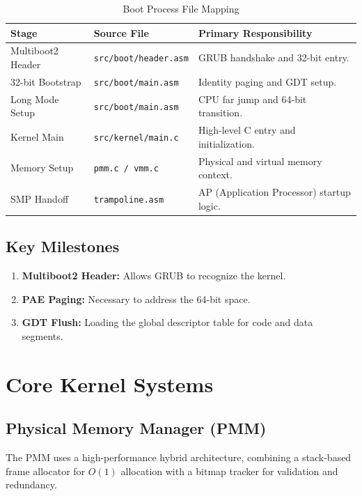 \documentclass[12pt,a4paper]{report}
\begin{document}
\begin{table}[h]
\centering
\begin{tabular}{|l|l|p{6cm}|}
\hline
\textbf{Stage} & \textbf{Source File} & \textbf{Primary Responsibility} \\ \hline
Multiboot2 Header & \texttt{src/boot/header.asm} & GRUB handshake and 32-bit entry. \\ \hline
32-bit Bootstrap & \texttt{src/boot/main.asm} & Identity paging and GDT setup. \\ \hline
Long Mode Setup & \texttt{src/boot/main.asm} & CPU far jump and 64-bit transition. \\ \hline
Kernel Main & \texttt{src/kernel/main.c} & High-level C entry and initialization. \\ \hline
Memory Setup & \texttt{pmm.c / vmm.c} & Physical and virtual memory context. \\ \hline
SMP Handoff & \texttt{trampoline.asm} & AP (Application Processor) startup logic. \\ \hline
\end{tabular}
\caption{Boot Process File Mapping}
\end{table}

\section{Key Milestones}
\begin{enumerate}
    \item \textbf{Multiboot2 Header:} Allows GRUB to recognize the kernel.
    \item \textbf{PAE Paging:} Necessary to address the 64-bit space.
    \item \textbf{GDT Flush:} Loading the global descriptor table for code and data segments.
\end{enumerate}

\newpage

\chapter{Core Kernel Systems}

\section{Physical Memory Manager (PMM)}
The PMM uses a high-performance hybrid architecture, combining a stack-based frame allocator for $O(1)$ allocation with a bitmap tracker for validation and redundancy.
\end{document}

